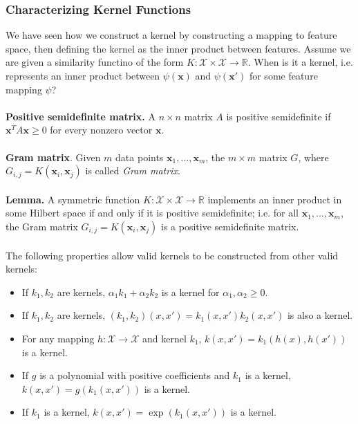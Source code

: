 \documentclass{article}
\begin{document}
   \subsubsection{Characterizing Kernel Functions}
   We have seen how we construct a kernel by constructing a mapping to feature space, then defining the kernel as the inner product between features. Assume we are given a similarity functino of the form $K:\mathcal{X} \times \mathcal{X} \rightarrow \mathbb{R}$. When is it a kernel, i.e. represents an inner product between $\psi(\mathbf{x})$ and $\psi(\mathbf{x}')$ for some feature mapping $\psi$? 
   \\\\
   \textbf{Positive semidefinite matrix.} A $n \times n$ matrix $A$ is positive semidefinite if $\mathbf{x}^TA\mathbf{x} \geq 0$ for every nonzero vector $\mathbf{x}$.
   \\\\
   \textbf{Gram matrix}. Given $m$ data points $\mathbf{x}_1,...,\mathbf{x}_m$, the $m \times m$ matrix $G$, where $G_{i,j} = K(\mathbf{x}_i, \mathbf{x}_j)$ is called \textit{Gram matrix}.
   \\\\
   \textbf{Lemma.} A symmetric function $K:\mathcal{X} \times \mathcal{X} \rightarrow \mathbb{R}$ implements an inner product in some Hilbert space if and only if it is positive semidefinite; i.e. for all $\mathbf{x}_1,...,\mathbf{x}_m$, the Gram matrix $G_{i,j} = K(\mathbf{x}_i, \mathbf{x}_j)$ is a positive semidefinite matrix.
   \\\\
   The following properties allow valid kernels to be constructed from other valid kernels:
   \begin{itemize}
   \item If $k_1, k_2$ are kernels, $\alpha_1 k_1 + \alpha_2 k_2$ is a kernel for $\alpha_1, \alpha_2 \geq 0$.
   \item If $k_1, k_2$ are kernels, $(k_1, k_2)(x, x') = k_1(x, x')k_2(x, x')$ is also a kernel.
   \item For any mapping $h:\mathcal{X} \rightarrow \mathcal{X}$ and kernel $k_1$, $k(x, x') = k_1(h(x), h(x'))$ is a kernel.
   \item If $g$ is a polynomial with positive coefficients and $k_1$ is a kernel, $k(x, x') = g(k_1(x,x'))$ is a kernel.
   \item If $k_1$ is a kernel, $k(x, x') = \exp (k_1(x,x'))$ is a kernel.
   \end{itemize}
   
\end{document}
